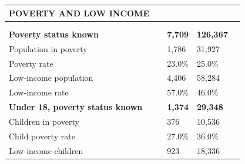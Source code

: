 \documentclass[9pt]{report}
\begin{document}
\vspace{12pt}
\setlength{\tabcolsep}{.01in} %
\begin{tabular}{p{.10in}p{.10in}p{.10in}p{3.7in}>{\hfill}p{.85in}>{\hfill}p{.85in}>{\hfill}p{.85in}>{\hfill}p{.85in}p{0.1in}}
\multicolumn{9}{l}{\parbox{7.1in}{\raggedright{\large{\strut\textbf{POVERTY AND LOW INCOME}\strut}}}} \\ 
\hline
\multicolumn{4}{l}{\parbox{3.5in}{\raggedright{\textbf{}}}} & \multicolumn{1}{r}{\parbox{.85in}{\strut\raggedleft{\textbf{}\strut}}} & \multicolumn{1}{r}{\parbox{.85in}{\strut\raggedleft{\textbf{}\strut}}} & \multicolumn{1}{r}{\parbox{.85in}{\strut{}}} & \multicolumn{1}{r}{\parbox{.85in}{\strut{}}} & \\ 
\multicolumn{9}{l}{} \\ 
\multicolumn{4}{l}{\parbox{3.5in}{\strut\raggedright{\textbf{Poverty status known}\strut}}} & \textbf{} & \textbf{} & \textbf{7,709} & \textbf{126,367} & \textbf{} \\ 
\multicolumn{4}{l}{\parbox{3.6in}{\strut\raggedright{{Population in poverty}}\strut}} &  &  & 1,786 & 31,927 & \multicolumn{1}{l}{}  \\ 
\multicolumn{4}{l}{\parbox{3.6in}{\strut\raggedright{{Poverty rate}}\strut}} &  &  & 23.0\% & 25.0\% & \multicolumn{1}{l}{}  \\ 
\multicolumn{4}{l}{\parbox{3.6in}{\strut\raggedright{{Low-income population}}\strut}} &  &  & 4,406 & 58,284 & \multicolumn{1}{l}{}  \\ 
\multicolumn{4}{l}{\parbox{3.6in}{\strut\raggedright{{Low-income rate}}\strut}} &  &  & 57.0\% & 46.0\% & \multicolumn{1}{l}{}  \\ 
\multicolumn{4}{l}{\parbox{3.5in}{\strut\raggedright{\textbf{Under 18, poverty status known}\strut}}} & \textbf{} & \textbf{} & \textbf{1,374} & \textbf{29,348} & \textbf{} \\ 
\multicolumn{4}{l}{\parbox{3.6in}{\strut\raggedright{{Children in poverty}}\strut}} &  &  & 376 & 10,536 & \multicolumn{1}{l}{}  \\ 
\multicolumn{4}{l}{\parbox{3.6in}{\strut\raggedright{{Child poverty rate}}\strut}} &  &  & 27.0\% & 36.0\% & \multicolumn{1}{l}{}  \\ 
\multicolumn{4}{l}{\parbox{3.6in}{\strut\raggedright{{Low-income children}}\strut}} &  &  & 923 & 18,336 & \multicolumn{1}{l}{}  \\ 

\end{tabular}
\end{document}
